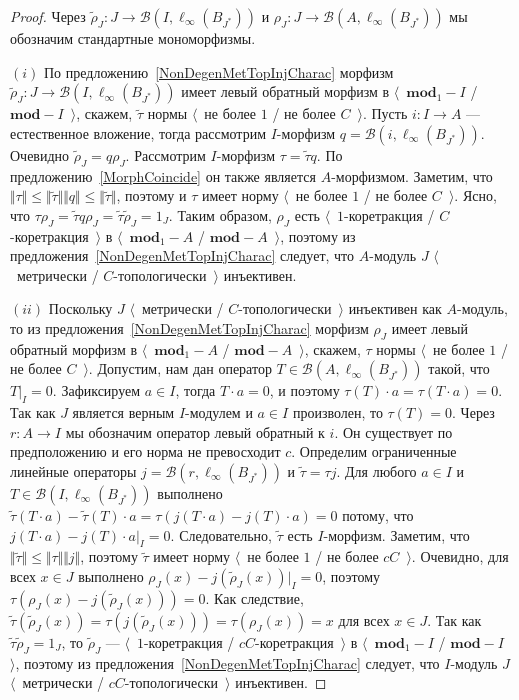 \begin{proof} Через $\widetilde{\rho}_J:J\to\mathcal{B}(I,\ell_\infty(B_{J^*}))$
и $\rho_J:J\to\mathcal{B}(A,\ell_\infty(B_{J^*}))$ мы обозначим стандартные
мономорфизмы.

$(i)$ По предложению~\ref{NonDegenMetTopInjCharac} морфизм $\widetilde{\rho}_J:
J\to\mathcal{B}(I,\ell_\infty(B_{J^*}))$ имеет левый обратный морфизм в
$\langle$~$\mathbf{mod}_1-I$ / $\mathbf{mod}-I$~$\rangle$, скажем,
$\widetilde{\tau}$ нормы $\langle$~не более $1$ / не более $C$~$\rangle$. Пусть
$i:I\to A$ --- естественное вложение, тогда рассмотрим $I$-морфизм
$q=\mathcal{B}(i,\ell_\infty(B_{J^*}))$. Очевидно $\widetilde{\rho}_J=q\rho_J$.
Рассмотрим $I$-морфизм $\tau =\widetilde{\tau} q$. По
предложению~\ref{MorphCoincide} он также является $A$-морфизмом. Заметим, что
$\Vert\tau \Vert\leq\Vert\widetilde{\tau}\Vert\Vert
q\Vert\leq\Vert\widetilde{\tau}\Vert$, поэтому и $\tau$ имеет норму $\langle$~не
более $1$ / не более $C$~$\rangle$. Ясно, что $\tau \rho_J=\widetilde{\tau}
q\rho_J=\widetilde{\tau}\widetilde{\rho}_J=1_J$. Таким образом, $\rho_J$ есть
$\langle$~$1$-коретракция / $C$-коретракция~$\rangle$ в
$\langle$~$\mathbf{mod}_1-A$ / $\mathbf{mod}-A$~$\rangle$, поэтому из
предложения~\ref{NonDegenMetTopInjCharac} следует, что $A$-модуль $J$
$\langle$~метрически / $C$-топологически~$\rangle$ инъективен.

$(ii)$ Поскольку $J$ $\langle$~метрически / $C$-топологически~$\rangle$
инъективен как $A$-модуль, то из предложения~\ref{NonDegenMetTopInjCharac}
морфизм $\rho_J$ имеет левый обратный морфизм в $\langle$~$\mathbf{mod}_1-A$ /
$\mathbf{mod}-A$~$\rangle$, скажем, $\tau $ нормы $\langle$~не более $1$ / не
более $C$~$\rangle$. Допустим, нам дан оператор $T\in
\mathcal{B}(A,\ell_\infty(B_{J^*}))$ такой, что $T|_I=0$. Зафиксируем $a\in I$,
тогда $T\cdot a=0$, и поэтому $\tau (T)\cdot a=\tau (T\cdot a)=0$. Так как $J$
является верным $I$-модулем и $a\in I$ произволен, то $\tau (T)=0$. Через
$r:A\to I$  мы обозначим оператор левый обратный к $i$. Он существует по
предположению и его норма не превосходит $c$. Определим ограниченные линейные
операторы $j=\mathcal{B}(r,\ell_\infty(B_{J^*}))$ и $\widetilde{\tau}=\tau  j$.
Для любого $a\in I$ и $T\in\mathcal{B}(I,\ell_\infty(B_{J^*}))$ выполнено
$\widetilde{\tau}(T\cdot a)-\widetilde{\tau}(T)\cdot a=\tau (j(T\cdot
a)-j(T)\cdot a)=0$ потому, что $j(T\cdot a)-j(T)\cdot a|_I=0$. Следовательно,
$\widetilde{\tau}$ есть $I$-морфизм. Заметим, что
$\Vert\widetilde{\tau}\Vert\leq\Vert\tau \Vert\Vert j\Vert$, поэтому
$\widetilde{\tau}$ имеет норму $\langle$~не более $1$ / не более $cC$~$\rangle$.
Очевидно, для всех $x\in J$ выполнено $\rho_J(x)-j(\widetilde{\rho}_J(x))|_I=0$,
поэтому $\tau (\rho_J(x)-j(\widetilde{\rho}_J(x)))=0$. Как следствие,
$\widetilde{\tau}(\widetilde{\rho}_J(x))=\tau (j(\widetilde{\rho}_J(x)))=\tau
(\rho_J(x))=x$ для всех $x\in J$. Так как
$\widetilde{\tau}\widetilde{\rho}_J=1_J$, то $\widetilde{\rho}_J$ ---
$\langle$~$1$-коретракция / $cC$-коретракция~$\rangle$ в
$\langle$~$\mathbf{mod}_1-I$ / $\mathbf{mod}-I$~$\rangle$, поэтому из
предложения~\ref{NonDegenMetTopInjCharac} следует, что $I$-модуль $J$
$\langle$~метрически / $cC$-топологически~$\rangle$ инъективен.
\end{proof}

